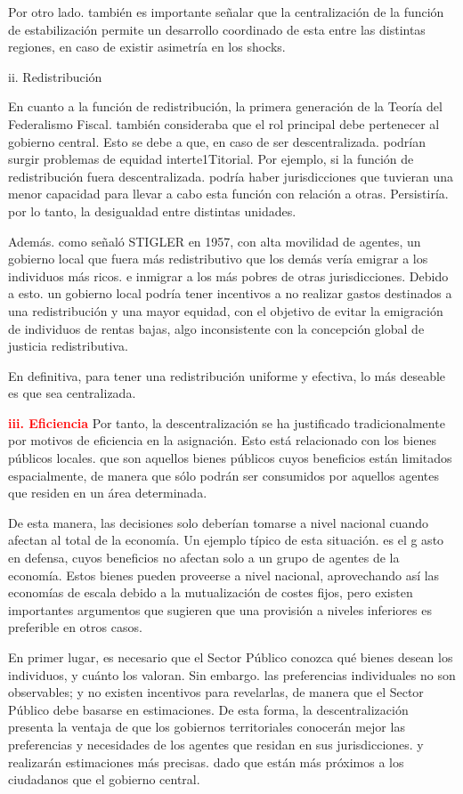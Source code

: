 \documentclass[10pt,a4paper]{article}
\begin{document}
Por otro lado. también es importante señalar que la centralización de la función de estabilización permite un desarrollo coordinado de esta entre las distintas regiones, en caso de existir asimetría en los shocks.

ii. Redistribución

En cuanto a la función de redistribución, la primera generación de la Teoría del Federalismo Fiscal. también consideraba que el rol principal debe pertenecer al gobierno central. Esto se debe a que, en caso de ser descentralizada. podrían surgir problemas de equidad interte1Titorial. Por ejemplo, si la función de redistribución fuera descentralizada. podría haber jurisdicciones que tuvieran una menor capacidad para llevar a cabo esta función con relación a otras. Persistiría. por lo tanto, la desigualdad entre distintas unidades.

Además. como señaló STIGLER en 1957, con alta movilidad de agentes, un gobierno local que fuera más redistributivo que los demás vería emigrar a los individuos más ricos. e inmigrar a los más pobres de otras jurisdicciones. Debido a esto. un gobierno local podría tener incentivos a no realizar gastos destinados a una redistribución y una mayor equidad, con el objetivo de evitar la emigración de individuos de rentas bajas, algo inconsistente con la concepción global de justicia redistributiva.

En definitiva, para tener una redistribución uniforme y efectiva, lo más deseable es que sea centralizada.

\textcolor{red}{\textbf{iii. Eficiencia}}
Por tanto, la descentralización se ha justificado tradicionalmente por motivos de eficiencia en la asignación. Esto está relacionado con los bienes públicos locales. que son aquellos bienes públicos cuyos beneficios están limitados espacialmente, de manera que sólo podrán ser consumidos por aquellos agentes que residen en un área determinada. 

De esta manera, las decisiones solo deberían tomarse a nivel nacional cuando afectan al total de la economía. Un ejemplo típico de esta situación. es el g asto en defensa, cuyos beneficios no afectan solo a un grupo de agentes de la economía. Estos bienes pueden proveerse a nivel nacional, aprovechando así las economías de escala debido a la mutualización de costes fijos, pero existen importantes argumentos que sugieren que una provisión a niveles inferiores es preferible en otros casos.

En primer lugar, es necesario que el Sector Público conozca qué bienes desean los individuos, y cuánto los valoran. Sin embargo. las preferencias individuales no son observables; y no existen incentivos para revelarlas, de manera que el Sector Público debe basarse en estimaciones. De esta forma, la descentralización presenta la ventaja de que los gobiernos territoriales conocerán mejor las preferencias y necesidades de los agentes que residan en sus jurisdicciones. y realizarán estimaciones más precisas. dado que están más próximos a los ciudadanos que el gobierno central.
\end{document}
